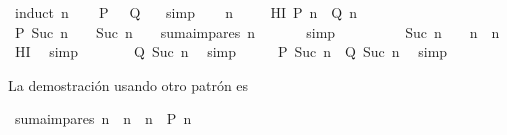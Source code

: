 \begin{isabellebody}
%
\isadelimproof
%
\endisadelimproof
%
\isatagproof
{}\isamarkupfalse%
\ {\isacharparenleft}induct\ n{\isacharparenright}\isanewline
\ \ \isamarkupfalse%
\ {\isachardoublequoteopen}{\isacharquery}P\ {}\ {\isacharequal}\ {\isacharquery}Q\ {}{\isachardoublequoteclose}\ \isamarkupfalse%
\ simp\isanewline
{}\isamarkupfalse%
\isanewline
\ \ \isamarkupfalse%
\ n\ \isanewline
\ \ \isamarkupfalse%
\ HI{\isacharcolon}\ {\isachardoublequoteopen}{\isacharquery}P\ n\ {\isacharequal}\ {\isacharquery}Q\ n{\isachardoublequoteclose}\isanewline
\ \ \isamarkupfalse%
\ {\isachardoublequoteopen}{\isacharquery}P\ {\isacharparenleft}Suc\ n{\isacharparenright}\ {\isacharequal}\ {\isacharparenleft}{}\ {\isacharasterisk}\ {\isacharparenleft}Suc\ n{\isacharparenright}\ {\isacharminus}\ {}{\isacharparenright}\ {\isacharplus}\ suma{\isacharunderscore}impares\ n{\isachardoublequoteclose}\ \isanewline
\ \ \ \ \isamarkupfalse%
\ simp\isanewline
\ \ \isamarkupfalse%
\ \isamarkupfalse%
\ {\isachardoublequoteopen}{\isasymdots}\ {\isacharequal}\ {\isacharparenleft}{}\ {\isacharasterisk}\ {\isacharparenleft}Suc\ n{\isacharparenright}\ {\isacharminus}\ {}{\isacharparenright}\ {\isacharplus}\ n\ {\isacharasterisk}\ n{\isachardoublequoteclose}\ \isamarkupfalse%
\ HI\ \isamarkupfalse%
\ simp\isanewline
\ \ \isamarkupfalse%
\ \isamarkupfalse%
\ {\isachardoublequoteopen}{\isasymdots}\ {\isacharequal}\ {\isacharquery}Q\ {\isacharparenleft}Suc\ n{\isacharparenright}{\isachardoublequoteclose}\ \isamarkupfalse%
\ simp\isanewline
\ \ \isamarkupfalse%
\ \isamarkupfalse%
\ {\isachardoublequoteopen}{\isacharquery}P\ {\isacharparenleft}Suc\ n{\isacharparenright}\ {\isacharequal}\ {\isacharquery}Q\ {\isacharparenleft}Suc\ n{\isacharparenright}{\isachardoublequoteclose}\ \isamarkupfalse%
\ simp\isanewline
{}\isamarkupfalse%
%
\endisatagproof
{\isafoldproof}%
%
\isadelimproof
%
\endisadelimproof
%
\begin{isamarkuptext}%
La demostración usando otro patrón es%
\end{isamarkuptext}\isamarkuptrue%
\isamarkupfalse%
\ {\isachardoublequoteopen}suma{\isacharunderscore}impares\ n\ {\isacharequal}\ n\ {\isacharasterisk}\ n{\isachardoublequoteclose}\ {\isacharparenleft}\ {\isachardoublequoteopen}{\isacharquery}P\ n{\isachardoublequoteclose}{\isacharparenright}\isanewline

\end{isabellebody}
